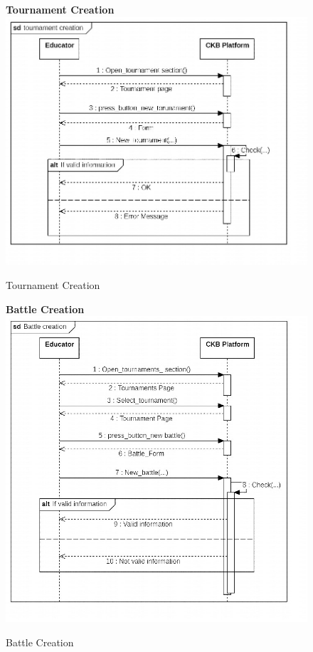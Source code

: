 \begin{enumerate}[label=\textbf{[UC\arabic*]}]
\begin{enumerate}[label=\textbf{[UC\arabic*]}]
    \begin{figure}
    \item \textbf{Tournament Creation}
        \centering
        \includegraphics[width= \textwidth]{Images/Tournament creation.jpg}
        \caption{Tournament Creation}
        \label{fig:enter-label}
    \end{figure}
    
    
    \begin{figure}
    \item \textbf{Battle Creation}
        \centering
        \includegraphics[width= \textwidth]{Images/Battle creation.jpg}
        \caption{Battle Creation}
        \label{fig:enter-label}
    \end{figure}
    

\end{enumerate}
\end{enumerate}
